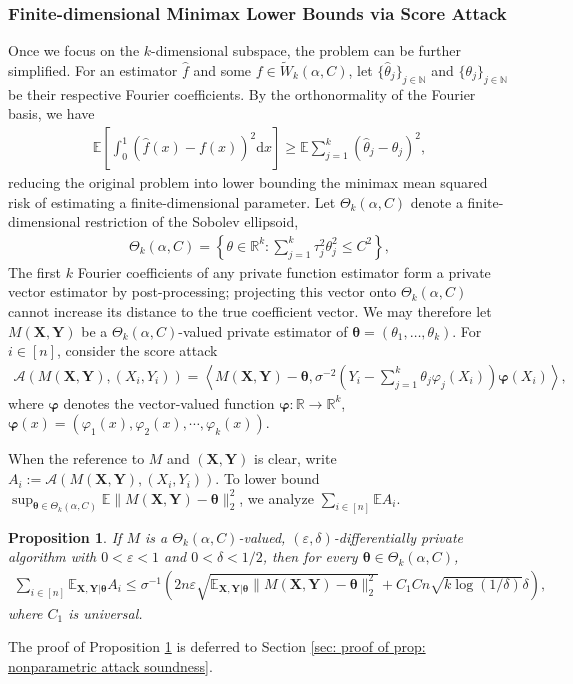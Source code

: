 \documentclass[letterpaper,12pt]{article}
\renewcommand{\d}{\mathrm{d}}
\numberwithin{equation}{section}
\theoremstyle{plain}
\numberwithin{Theorem}{section}
\newtheorem{proposition}{Proposition}
\numberwithin{proposition}{section}
\numberwithin{Lemma}{section}
{
	\theoremstyle{definition}
	\newtheorem{Definition}{Definition}
	\newtheorem{example}{Example}
	\numberwithin{example}{section}
	\newtheorem{fact}{Fact}
	\numberwithin{fact}{section}
	\newtheorem{remark}{Remark}
}
\newcommand{\rev}[1]{#1}
\newcommand{\1}{\mathbbm{1}}
\def\bth{{\boldsymbol{\theta}}}
\def\R{{\mathbb R}}
\def\E{\mathbb{E}}
\begin{document}
	\subsubsection{Finite-dimensional Minimax Lower Bounds via Score Attack}
	Once we focus on the $k$-dimensional subspace, the problem can be further simplified. For an estimator $\hat f$ and some $f \in \tilde W_k(\alpha, C)$, let $\{\hat\theta_j\}_{j \in \mathbb N}$ and $\{\theta_j\}_{j \in \mathbb N}$ be their respective Fourier coefficients. By the orthonormality of the Fourier basis, we have
	\begin{align}\label{eq: nonparametric integrated risk reduction to coefficient}
		\E \left[ \int_0^1 (\hat f(x) - f(x))^2 \d x \right] \geq \E \sum_{j=1}^k (\hat \theta_j - \theta_j)^2,
	\end{align}
	reducing the original problem into lower bounding the minimax mean squared risk of estimating a finite-dimensional parameter. Let $\Theta_k(\alpha, C)$ denote a finite-dimensional restriction of the Sobolev ellipsoid,
	\begin{align*}
		\Theta_k(\alpha, C) = \left\{\theta \in \R^k: \rev{\sum_{j=1}^k \tau_j^2 \theta_j^2 \leq C^2}\right\}, 
	\end{align*}
		The first $k$ Fourier coefficients of any private function estimator form a private vector estimator by post-processing; projecting this vector onto $\Theta_k(\alpha,C)$ cannot increase its distance to the true coefficient vector. We may therefore let $M(\bm X,\bm Y)$ be a $\Theta_k(\alpha,C)$-valued private estimator of $\bth=(\theta_1,\ldots,\theta_k)$. For $i\in[n]$, consider the score attack
	\begin{align*}
		\mathcal A(M(\bm X, \bm Y), (X_i, Y_i)) = \left\langle M(\bm X, \bm Y) - \bth,  \sigma^{-2}\left(Y_i - \sum_{j=1}^k \theta_j\varphi_j(X_i)\right)\bm\varphi(X_i)\right\rangle, 
	\end{align*}
		where $\bm\varphi$ denotes the vector-valued function $\bm\varphi: \R \to \R^k$, $\bm \varphi(x) = \left(\varphi_1(x), \varphi_2(x), \cdots, \varphi_k(x)\right)$.
		
		When the reference to $M$ and $(\bm X, \bm Y)$ is clear, write $A_{i} := \mathcal A(M(\bm X, \bm Y), (X_i, Y_i))$. To lower bound $\sup_{\bth \in \Theta_k(\alpha, C)} \E\|M(\bm X, \bm Y)-\bth\|_2^2$, we analyze $\sum_{i \in [n]} \E A_{i}$.
	
	\begin{proposition}\label{prop: nonparametric attack soundness}
			If $M$ is a $\Theta_k(\alpha,C)$-valued, $(\varepsilon, \delta)$-differentially private algorithm with $0 < \varepsilon < 1$ and $0<\delta<1/2$, then for every $\bth \in \Theta_k(\alpha, C)$,
		\begin{align}\label{eq: prop: nonparametric attack soundness}
				\sum_{i \in [n]} \E_{\bm X, \bm Y|\bth} A_{i} \leq \sigma^{-1}\left(2n\varepsilon \sqrt{\E_{\bm X, \bm Y|\bth}\|M(\bm X, \bm Y) - \bth\|_2^2} + C_1Cn\sqrt{k\log(1/\delta)}\delta\right),
			\end{align}
			where $C_1$ is universal.
	\end{proposition}
	The proof of Proposition \ref{prop: nonparametric attack soundness} is deferred to Section \ref{sec: proof of prop: nonparametric attack soundness}.
	
\end{document}
